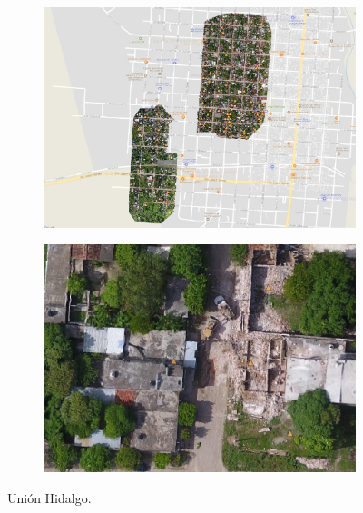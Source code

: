\begin{figure}[!h]
  \centering
    \begin{subfigure}{.9\textwidth}
        \includegraphics[width=\textwidth]{images/union-ortho.jpg}
    \end{subfigure}
    \begin{subfigure}{.9\textwidth}
        \includegraphics[width=\textwidth]{images/union-example.jpg}
    \end{subfigure}
  \caption{Uni\'on Hidalgo.}
  \label{fig:union-gis}
\end{figure}



